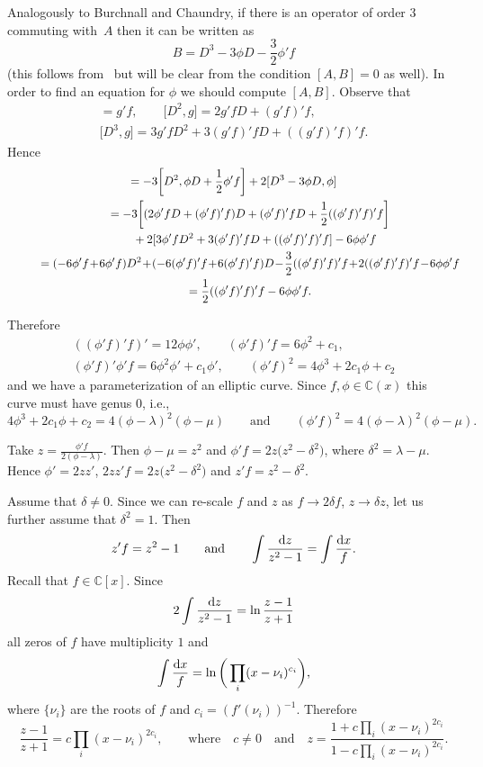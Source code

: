 \documentclass[pdftex]{sigma}
\numberwithin{equation}{section}
\newcommand{\C}{\mathbb C}
\newcommand{\la}{\lambda}
\begin{document}
Analogously to Burchnall and Chaundry, if there is an operator of order $3$ commuting with~$A$ then it can be written as
\[
B = D^3 - 3\phi D - \frac{3}{2}\phi'f
\]
(this follows from~\cite{BC1} but will be clear from the condition $[A, B] = 0$ as well).
In order to find an equation for $\phi$ we should compute $[A, B]$. Observe that
\begin{gather*}
[D, g(x)] = g'f, \qquad
\big[D^2, g\big] = 2g'fD + (g'f)'f, \\
\big[D^3, g\big] = 3g'fD^2 + 3(g'f)'fD + ((g'f)'f)'f.
\end{gather*}
Hence
\begin{gather*}
[A,B] = -3\bigg[D^2, \phi D + \frac{1}{2}\phi'f\bigg] + 2[D^3 - 3\phi D, \phi]
\\ \hphantom{[A,B]}
{}= -3\bigg[(2\phi'fD + (\phi'f)'f)D + (\phi'f)'fD + \frac{1}{2}((\phi'f)'f)'f\bigg]
\\ \hphantom{[A,B]=}
{}+ 2[3\phi'fD^2 + 3(\phi'f)'fD + ((\phi'f)'f)'f] - 6\phi\phi'f
\\ \hphantom{[A,B]}
{}= (-6\phi'f\! + \!6\phi'f)D^2 \!+\! (-6(\phi'f)'f \!+ \!6(\phi'f)'f)D
\!-\! \frac{3}{2}((\phi'f)'f)'f\!+ \!2((\phi'f)'f)'f\! -\! 6\phi\phi'f
\\ \hphantom{[A,B]}
{}= \frac{1}{2}((\phi'f)'f)'f - 6\phi\phi'f.
\end{gather*}

Therefore
\begin{gather*}
((\phi'f)'f)' = 12\phi\phi', \qquad
(\phi'f)'f = 6\phi^2 + c_1,
\\
(\phi'f)'\phi'f = 6\phi^2\phi' + c_1\phi',\qquad
(\phi'f)^2 = 4\phi^3 + 2c_1\phi + c_2
\end{gather*}
 and we have a parameterization of an elliptic curve. Since $f, \phi \in \C(x)$ this curve must have genus $0$, i.e.,
 \[
 4\phi^3 + 2c_1\phi + c_2 = 4(\phi - \la)^2(\phi - \mu)\qquad \text{and}\qquad (\phi'f)^2 = 4(\phi - \la)^2(\phi - \mu).
 \]

Take $z = \frac{\phi'f}{2(\phi - \la)}$. Then $\phi - \mu = z^2$ and $\phi'f = 2z\big(z^2 - \delta^2\big)$, where $\delta^2 = \la - \mu$. Hence $\phi' = 2zz'$, $2zz'f = 2z\big(z^2 - \delta^2\big)$ and $z'f = z^2 - \delta^2$.

Assume that $\delta \ne 0$. Since we can re-scale $f$ and $z$ as $f \rightarrow 2\delta f$, $z \rightarrow \delta z$, let us further assume that $\delta^2 = 1$.
Then
\[
z'f = z^2 - 1\qquad\text{and}\qquad
\int \frac{{\rm d} z}{z^2 - 1} = \int \frac{{\rm d} x}{f}.
\]
Recall that $f \in \C[x]$. Since
\[
2\int\frac{{\rm d} z}{z^2 - 1} = \ln\frac{z - 1}{z + 1}
\]
all zeros of $f$ have multiplicity $1$ and
\[\int \frac{{\rm d} x}{f} = \ln\bigg(\prod_i(x - \nu_i)^{c_i}\bigg),\] where $\{\nu_i\}$ are the roots of $f$ and $c_i = (f'(\nu_i))^{-1}$. Therefore
\[
\frac{z - 1}{z + 1} = c \prod_i(x - \nu_i)^{2c_i}, \qquad\text{where}\quad
c \ne 0\quad\text{and}\quad
z = \frac{1 + c \prod_i(x - \nu_i)^{2c_i}}{1 - c \prod_i(x - \nu_i)^{2c_i}}.
\]
\end{document}
